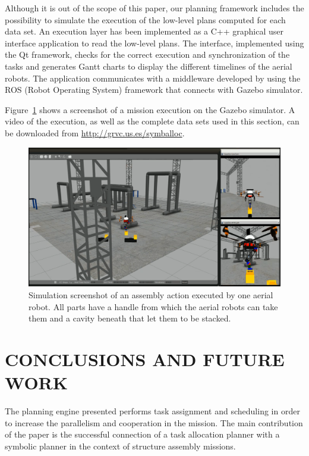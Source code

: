 \documentclass[letterpaper, 10 pt, conference]{ieeeconf}  %
\begin{document}
Although it is out of the scope of this paper, our planning framework includes the possibility to simulate the execution of the low-level plans computed for each data set. An execution layer has been implemented as a C++ graphical user interface application to read the low-level plans. The interface, implemented using the Qt framework, checks for the correct execution and synchronization of the tasks and generates Gantt charts to display the different timelines of the aerial robots. The application communicates with a middleware developed by using the ROS (Robot Operating System) framework that connects with Gazebo simulator.

Figure~\ref{fig:sim2} shows a screenshot of a mission execution on the Gazebo simulator. A video of the execution, as well as the complete data sets used in this section, can be downloaded from \url{http://grvc.us.es/symballoc}.

\begin{figure}
    \centering
    \includegraphics[width=0.99\columnwidth]{sim3.png}
    \caption[Simulation screenshot of an assembly action.]{Simulation screenshot of an assembly action executed by one aerial robot. All parts have a handle from which the aerial robots can take them and a cavity beneath that let them to be stacked.}
    \label{fig:sim2}
\end{figure}

\section{CONCLUSIONS AND FUTURE WORK}
	\label{sec:conclusions}

The planning engine presented performs task assignment and scheduling in order to increase the parallelism and cooperation in the mission. The main contribution of the paper is the successful connection of a task allocation planner with a symbolic planner in the context of structure assembly missions.
\end{document}
